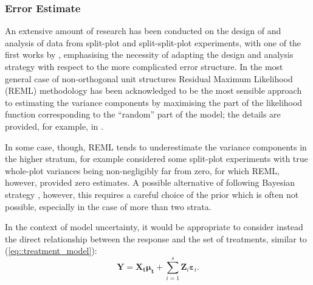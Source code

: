 \subsubsection*{Error Estimate}
An extensive amount of research has been conducted on the design of and analysis of data from split-plot and split-split-plot experiments, with one of the first works by \cite{Letsinger1996BiRandomization}, emphasising the necessity of adapting the design and analysis strategy with respect to the more complicated error structure.  In the most general case of non-orthogonal unit structures Residual Maximum Likelihood (REML) methodology has been acknowledged to be the most sensible approach to estimating the variance components by maximising the part of the likelihood function corresponding to the ``random'' part of the model; the details are provided, for example, in \cite{Searle2001generalized}. 


In some case, though,  REML tends to underestimate the variance components in the higher stratum, for example \cite{Goos2006practical} considered some split-plot experiments with true whole-plot variances being non-negligibly far from zero, for which REML, however, provided zero estimates. A possible alternative of following Bayesian strategy \citep{Gilmour2009analysis}, however, this requires a careful choice of the prior which is often not possible, especially in the case of more than two strata.

In the context of model uncertainty, it would be appropriate to consider instead the direct relationship between the response and the set of treatments, similar to (\ref{eq::treatment_model}):
\begin{equation}
\label{eq::treatmentMS}
\bm{Y}=\bm{X_t}\bm{\mu_t}+\sum_{i=1}^{s}\bm{Z}_{i}\bm{\varepsilon}_{i}.
\end{equation}

